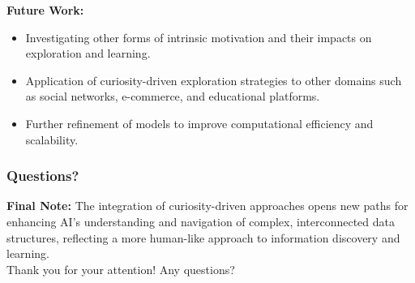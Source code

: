 \documentclass{beamer}
\begin{document}
\begin{frame}
\textbf{Future Work:}
\begin{itemize}
    \item Investigating other forms of intrinsic motivation and their impacts on exploration and learning.
    \item Application of curiosity-driven exploration strategies to other domains such as social networks, e-commerce, and educational platforms.
    \item Further refinement of models to improve computational efficiency and scalability.
\end{itemize}

\end{frame}

\begin{frame}
\frametitle{Questions?}
\textbf{Final Note:}
The integration of curiosity-driven approaches opens new paths for enhancing AI's understanding and navigation of complex, interconnected data structures, reflecting a more human-like approach to information discovery and learning.\\
Thank you for your attention! Any questions?
\end{frame}


\end{document}
